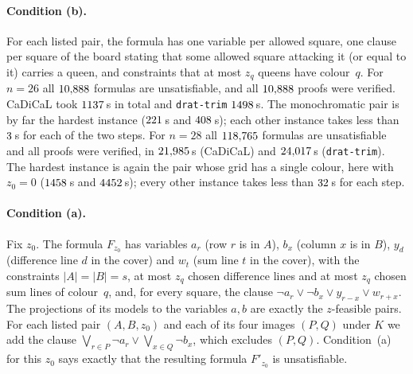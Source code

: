 \documentclass[11pt]{article}
\theoremstyle{definition}
\theoremstyle{remark}
\begin{document}
\paragraph{Condition (b).} For each listed pair, the formula has one variable per allowed square, one
clause per square of the board stating that some allowed square attacking it (or equal to it) carries a
queen, and constraints that at most $z_q$ queens have colour~$q$. For $n=26$ all $10{,}888$
formulas are unsatisfiable, and all $10{,}888$ proofs were verified. CaDiCaL took $1137$\,s
in total and \texttt{drat-trim} $1498$\,s. The monochromatic pair is by far the hardest instance
($221$\,s and $408$\,s); each other instance takes less than $3$\,s for
each of the two steps. For $n=28$ all $118{,}765$ formulas are unsatisfiable and all proofs were
verified, in $21{,}985$\,s (CaDiCaL) and $24{,}017$\,s (\texttt{drat-trim}). The hardest
instance is again the pair whose grid has a single colour, here with $z_0=0$ ($1458$\,s and
$4452$\,s); every other instance takes less than $32$\,s for each step.

\paragraph{Condition (a).} Fix $z_0$. The formula $F_{z_0}$ has variables $a_r$ (row $r$ is in $A$), $b_x$
(column $x$ is in $B$), $y_d$ (difference line $d$ in the cover) and $w_t$ (sum line $t$ in the cover), with the
constraints $|A|=|B|=s$, at most $z_q$ chosen difference lines and at most $z_q$ chosen sum lines of
colour~$q$, and, for every square, the clause $\neg a_r\vee\neg b_x\vee y_{r-x}\vee w_{r+x}$. The
projections of its models to the variables $a,b$ are exactly the $z$-feasible pairs. For each listed
pair $(A,B,z_0)$ and each of its four images $(P,Q)$ under $K$ we add the clause
$\bigvee_{r\in P}\neg a_r\vee\bigvee_{x\in Q}\neg b_x$, which excludes $(P,Q)$. Condition~(a) for this
$z_0$ says exactly that the resulting formula $F'_{z_0}$ is unsatisfiable.
\end{document}
